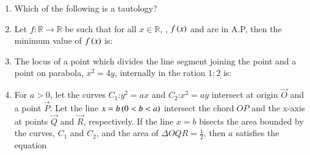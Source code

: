 \documentclass[journal,12pt,onecolumn]{IEEEtran}
\theoremstyle{remark}
\begin{document}
\begin{enumerate}
\item Which of the following is a tautology?
\begin{enumerate}
\end{enumerate}

\item Let $f:\mathbb{R}\rightarrow\mathbb{R}$ be such that for all $x\in\mathbb{R}$, , $f\left(x\right)$ and  are in A.P, then the minimum value of $f\left(x\right)$ is:
\begin{enumerate}
\end{enumerate}

\item The locus of a point which divides the line segment joining the point  and a point on parabola, $x^2 = 4y$, internally in the ration $1:2$ is:
\begin{enumerate}
\end{enumerate}

\item For $a>0$, let the curves $C_1$:$y^2=ax$ and $C_2$:$x^2=ay$ intersect at origin $\vec{O}$ and a point $\vec{P}$. Let the line $x=b\left(0<b<a\right)$ intersect the chord $OP$ and the x-axis at points $\vec{Q}$ and $\vec{R}$, respectively. If the line $x=b$ bisects the area bounded by the curves, $C_1$ and $C_2$, and the area of $\Delta OQR = \frac{1}{2}$, then $a$ satisfies the equation
\begin{enumerate}
\end{enumerate}


\end{enumerate}
\end{document}
